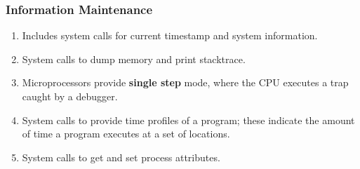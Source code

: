 \documentclass[journal,12pt,twocolumn]{IEEEtran}
\begin{document}
\subsubsection{Information Maintenance}
\begin{enumerate}
    \item Includes system calls for current timestamp and system information.
    \item System calls to dump memory and print stacktrace.
    \item Microprocessors provide \textbf{single step} mode, where the CPU 
    executes a trap caught by a debugger.
    \item System calls to provide time profiles of a program; these indicate the 
    amount of time a program executes at a set of locations.
    \item System calls to get and set process attributes.
\end{enumerate}
\end{document}
